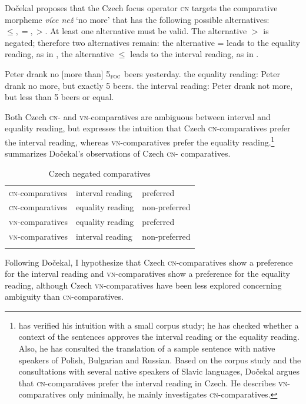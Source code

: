 \documentclass[output=paper,
]{langscibook}
\begin{document}
\noindent Dočekal proposes that the Czech focus operator \textsc{cn} targets the comparative morpheme \textit{více než} `no more' that has the following possible alternatives: $\leq, =, >$. At least one alternative must be valid. The alternative $>$ is negated; therefore two alternatives remain: the alternative = leads to the equality reading, as in , the alternative $\leq$ leads to the interval reading, as in .

\ea Peter drank no [more than] 5$_{\textsc{foc}}$ beers yesterday. 
	\ea the equality reading: Peter drank no more, but exactly 5 beers. \label{ex:exh_beer}
	\ex the interval reading: Peter drank not more, but less than 5 beers or equal. \label{ex:int_beer}
\z
\z

\noindent Both Czech \textsc{cn-} and \textsc{vn-}comparatives are ambiguous between interval and equality reading, but \cite{dovcekal2017upper} expresses the intuition that Czech \textsc{cn-}comparatives prefer the interval reading, whereas \textsc{vn-}comparatives prefer the equality reading.\footnote{\cite{dovcekal2017upper} has verified his intuition with a small corpus study; he has checked whether a context of the sentences approves the interval reading or the equality reading. Also, he has consulted the translation of a sample sentence with native speakers of Polish, Bulgarian and Russian. Based on the corpus study and the consultations with several native speakers of Slavic languages, Dočekal argues that \textsc{cn-}comparatives prefer the interval reading in Czech. He describes \textsc{vn-}comparatives only minimally, he mainly investigates \textsc{cn-}comparatives.
}  summarizes Dočekal's observations of Czech \textsc{cn-} comparatives.

\begin{table}
\caption{Czech negated comparatives}
\label{tab:2:cz_comp}
 \begin{tabular}{lll} 
  \lsptoprule
    \textsc{cn-}comparatives & interval reading & preferred\\
  \textsc{cn-}comparatives & equality reading & non-preferred\\
   \textsc{vn-}comparatives & equality reading & preferred\\
  \textsc{vn-}comparatives & interval reading & non-preferred\\  \lspbottomrule 
  \end{tabular}
  \end{table}


Following Dočekal, I hypothesize that Czech \textsc{cn-}comparatives show a preference for the interval reading and \textsc{vn-}comparatives show a preference for the equality reading, although Czech \textsc{vn-}comparatives have been less explored concerning ambiguity than \textsc{cn-}comparatives. 
\end{document}
